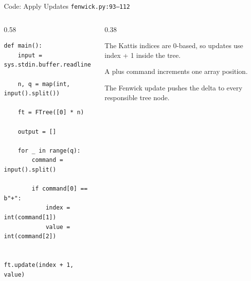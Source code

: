 \documentclass[aspectratio=169,11pt]{beamer}
\begin{document}
\begin{frame}[fragile]{Code: Apply Updates}
\scriptsize
{} \texttt{fenwick.py:93--112}

\vspace{0.08cm}
\begin{columns}[T,totalwidth=\textwidth]
\begin{column}{0.58\textwidth}
\begin{lstlisting}[style=cpcode]
def main():
    input = sys.stdin.buffer.readline

    n, q = map(int, input().split())

    ft = FTree([0] * n)

    output = []

    for _ in range(q):
        command = input().split()

        if command[0] == b"+":
            index = int(command[1])
            value = int(command[2])

            ft.update(index + 1, value)
\end{lstlisting}
\end{column}
\begin{column}{0.38\textwidth}
\begin{tightitemize}
  \item The Kattis indices are 0-based, so updates use index + 1 inside the tree.
  \item A plus command increments one array position.
  \item The Fenwick update pushes the delta to every responsible tree node.
\end{tightitemize}
\end{column}
\end{columns}
\end{frame}
\end{document}
